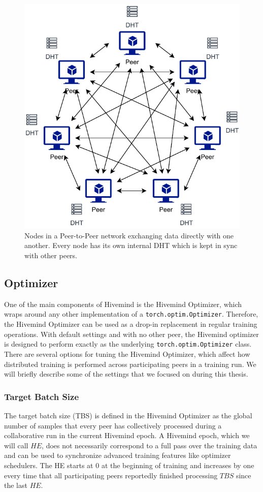 \begin{figure}[h]
    \centering
    \caption{Nodes in a Peer-to-Peer network exchanging data directly with one another. Every node has its own internal DHT which is kept in sync with other peers.}
    \label{fig:dht-communication}
    \includegraphics[width=0.5 \textwidth]{./figures/02_dht-communication.pdf}
\end{figure}

\subsection{Optimizer}
One of the main components of Hivemind is the Hivemind Optimizer, which wraps around any other implementation of a \texttt{torch.optim.Optimizer}.
Therefore, the Hivemind Optimizer can be used as a drop-in replacement in regular training operations.
With default settings and with no other peer, the Hivemind optimizer is designed to perform exactly as the underlying \texttt{torch.optim.Optimizer} class.
There are several options for tuning the Hivemind Optimizer, which affect how distributed training is performed across participating peers in a training run.
We will briefly describe some of the settings that we focused on during this thesis.

\subsubsection{Target Batch Size}

The target batch size (TBS) is defined in the Hivemind Optimizer as the global number of samples that every peer has collectively processed during a collaborative run in the current Hivemind epoch.
A Hivemind epoch, which we will call $HE$, does not necessarily correspond to a full pass over the training data and can be used to synchronize advanced training features like optimizer schedulers.
The HE starts at 0 at the beginning of training and increases by one every time that all participating peers reportedly finished processing $TBS$ since the last $HE$.

